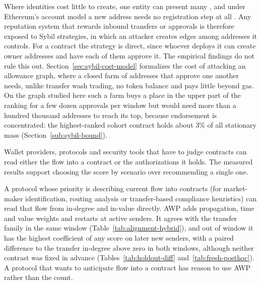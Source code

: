 
Where identities cost little to create, one entity can present many \parencite{douceur2002sybil}, and under Ethereum's account model a new address needs no registration step at all \parencite{wood2025yellowpaper}. Any reputation system that rewards inbound transfers or approvals is therefore exposed to Sybil strategies, in which an attacker creates edges among addresses it controls. For a contract the strategy is direct, since whoever deploys it can create owner addresses and have each of them approve it. The empirical findings do not rule this out. Section~\ref{sec:sybil-cost-model} formalizes the cost of attacking an allowance graph, where a closed farm of addresses that approve one another needs, unlike transfer wash trading, no token balance and pays little beyond gas. On the graph studied here such a farm buys a place in the upper part of the ranking for a few dozen approvals per window but would need more than a hundred thousand addresses to reach its top, because endorsement is concentrated: the highest-ranked cohort contract holds about 3\% of all stationary mass (Section~\ref{sub:sybil-bound}).


Wallet providers, protocols and security tools that have to judge contracts can read either the flow into a contract or the authorizations it holds. The measured results support choosing the score by scenario over recommending a single one.


A protocol whose priority is describing current flow into contracts (for market-maker identification, routing analysis or transfer-based compliance heuristics) can read that flow from in-degree and in-value directly. AWP \parencite{do2023awp} adds propagation, time and value weights and restarts at active senders. It agrees with the transfer family in the same window (Table~\ref{tab:alignment-hybrid}), and out of window it has the highest coefficient of any score on later new senders, with a paired difference to the transfer in-degree above zero in both windows, although neither contrast was fixed in advance (Tables~\ref{tab:holdout-diff} and~\ref{tab:fresh-posthoc}). A protocol that wants to anticipate flow into a contract has reason to use AWP rather than the count.

